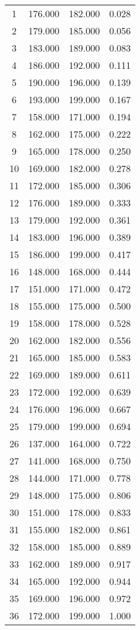 % 
\begin{tabular}{cccc}
  \hline
  \hline
1 & 176.000 & 182.000 & 0.028 \\ 
  2 & 179.000 & 185.000 & 0.056 \\ 
  3 & 183.000 & 189.000 & 0.083 \\ 
  4 & 186.000 & 192.000 & 0.111 \\ 
  5 & 190.000 & 196.000 & 0.139 \\ 
  6 & 193.000 & 199.000 & 0.167 \\ 
  7 & 158.000 & 171.000 & 0.194 \\ 
  8 & 162.000 & 175.000 & 0.222 \\ 
  9 & 165.000 & 178.000 & 0.250 \\ 
  10 & 169.000 & 182.000 & 0.278 \\ 
  11 & 172.000 & 185.000 & 0.306 \\ 
  12 & 176.000 & 189.000 & 0.333 \\ 
  13 & 179.000 & 192.000 & 0.361 \\ 
  14 & 183.000 & 196.000 & 0.389 \\ 
  15 & 186.000 & 199.000 & 0.417 \\ 
  16 & 148.000 & 168.000 & 0.444 \\ 
  17 & 151.000 & 171.000 & 0.472 \\ 
  18 & 155.000 & 175.000 & 0.500 \\ 
  19 & 158.000 & 178.000 & 0.528 \\ 
  20 & 162.000 & 182.000 & 0.556 \\ 
  21 & 165.000 & 185.000 & 0.583 \\ 
  22 & 169.000 & 189.000 & 0.611 \\ 
  23 & 172.000 & 192.000 & 0.639 \\ 
  24 & 176.000 & 196.000 & 0.667 \\ 
  25 & 179.000 & 199.000 & 0.694 \\ 
  26 & 137.000 & 164.000 & 0.722 \\ 
  27 & 141.000 & 168.000 & 0.750 \\ 
  28 & 144.000 & 171.000 & 0.778 \\ 
  29 & 148.000 & 175.000 & 0.806 \\ 
  30 & 151.000 & 178.000 & 0.833 \\ 
  31 & 155.000 & 182.000 & 0.861 \\ 
  32 & 158.000 & 185.000 & 0.889 \\ 
  33 & 162.000 & 189.000 & 0.917 \\ 
  34 & 165.000 & 192.000 & 0.944 \\ 
  35 & 169.000 & 196.000 & 0.972 \\ 
  36 & 172.000 & 199.000 & 1.000 \\ 
   \hline
\end{tabular}
